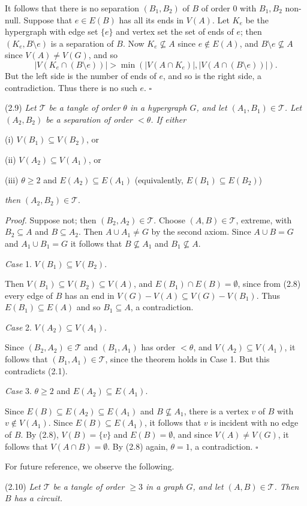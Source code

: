 It follows that there is no separation $(B_1, B_2)$ of $B$ of order $0$ with $B_1, B_2$ non-null. Suppose that $e\in E(B)$ has all its ends in $V(A)$. Let $K_e$ be the hypergraph with edge set $\{e\}$ and vertex set the set of ends of $e$; then $(K_e, B\setminus e)$ is a separation of $B$. Now $K_e\nsubseteq A$ since $e\notin E(A)$, and $B\setminus e\nsubseteq A$ since $V(A)\ne V(G)$, and so
\begin{equation*}
|V(K_e\cap (B\setminus e))| > \min(|V(A\cap K_e)|, |V(A\cap (B\setminus e))|).
\end{equation*}
But the left side is the number of ends of $e$, and so is the right side, a contradiction. Thus there is no such $e$. $\square$

\stmt
(2.9) \textit{Let $\mathscr{T}$ be a tangle of order $\theta$ in a hypergraph $G$, and let $(A_1, B_1)\in \mathscr{T}$. Let $(A_2, B_2)$ be a separation of order $<\theta$. If either}

\hspace*{12pt}(i) $V(B_1)\subseteq V(B_2)$, or

\hspace*{12pt}(ii) $V(A_2)\subseteq V(A_1)$, or

\hspace*{12pt}(iii) $\theta \ge 2$ and $E(A_2)\subseteq E(A_1)$ (equivalently, $E(B_1)\subseteq E(B_2)$)

\textit{then} $(A_2, B_2)\in \mathscr{T}$.

\textit{Proof.} Suppose not; then $(B_2, A_2)\in \mathscr{T}$. Choose $(A, B)\in \mathscr{T}$, extreme, with $B_2\subseteq A$ and $B\subseteq A_2$. Then $A\cup A_1\ne G$ by the second axiom. Since $A\cup B = G$ and $A_1\cup B_1 = G$ it follows that $B\nsubseteq A_1$ and $B_1\nsubseteq A$.

\textit{Case} 1. $V(B_1)\subseteq V(B_2)$.

Then $V(B_1)\subseteq V(B_2)\subseteq V(A)$, and $E(B_1)\cap E(B) = \emptyset$, since from (2.8) every edge of $B$ has an end in $V(G) - V(A)\subseteq V(G) - V(B_1)$. Thus $E(B_1)\subseteq E(A)$ and so $B_1\subseteq A$, a contradiction.

\textit{Case} 2. $V(A_2)\subseteq V(A_1)$.

Since $(B_2, A_2)\in \mathscr{T}$ and $(B_1, A_1)$ has order $<\theta$, and $V(A_2)\subseteq V(A_1)$, it follows that $(B_1, A_1)\in \mathscr{T}$, since the theorem holds in Case 1. But this contradicts (2.1).

\textit{Case} 3. $\theta \ge 2$ and $E(A_2)\subseteq E(A_1)$.

Since $E(B)\subseteq E(A_2)\subseteq E(A_1)$ and $B\nsubseteq A_1$, there is a vertex $v$ of $B$ with $v\notin V(A_1)$. Since $E(B)\subseteq E(A_1)$, it follows that $v$ is incident with no edge of $B$. By (2.8), $V(B) = \{v\}$ and $E(B) = \emptyset$, and since $V(A)\ne V(G)$, it follows that $V(A\cap B) = \emptyset$. By (2.8) again, $\theta = 1$, a contradiction. $\square$

For future reference, we observe the following.

\stmt
(2.10) \textit{Let $\mathscr{T}$ be a tangle of order $\ge 3$ in a graph $G$, and let $(A, B)\in \mathscr{T}$. Then $B$ has a circuit.}
